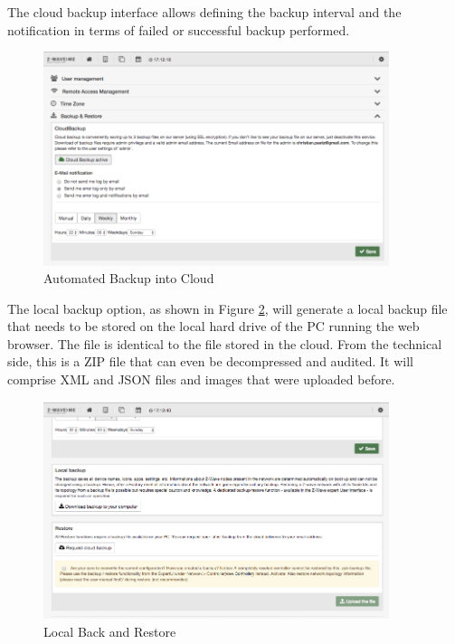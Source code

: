 The cloud backup interface allows defining the backup interval and the notification in 
terms of failed or successful backup performed.

\begin{figure}
\begin{center}
\includegraphics[width=0.9\textwidth]{pngs/cap4/shui74.png}
\caption{Automated Backup into Cloud}
\label{shui74}
\end{center}
\end{figure}

The local backup option, as shown in Figure \ref{shui75}, will generate a local backup 
file that needs to be stored on the local hard drive of the PC running the web browser. 
The file is identical to the file stored in the cloud. From the technical side, this is 
a ZIP file that can even be decompressed and audited. It will comprise XML and JSON files 
and images that were uploaded before.

\begin{figure}
\begin{center}
\includegraphics[width=0.9\textwidth]{pngs/cap4/shui75.png}
\caption{Local Back and Restore}
\label{shui75}
\end{center}
\end{figure}

